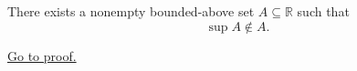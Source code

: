 \begin{proposition}
\label{prop:supremum-need-not-belong-to-the-set}
There exists a nonempty bounded-above set $A\subseteq\mathbb{R}$ such that
\[
  \sup A\notin A.
\]

\hyperref[prf:supremum-need-not-belong-to-the-set]{Go to proof.}
\end{proposition}